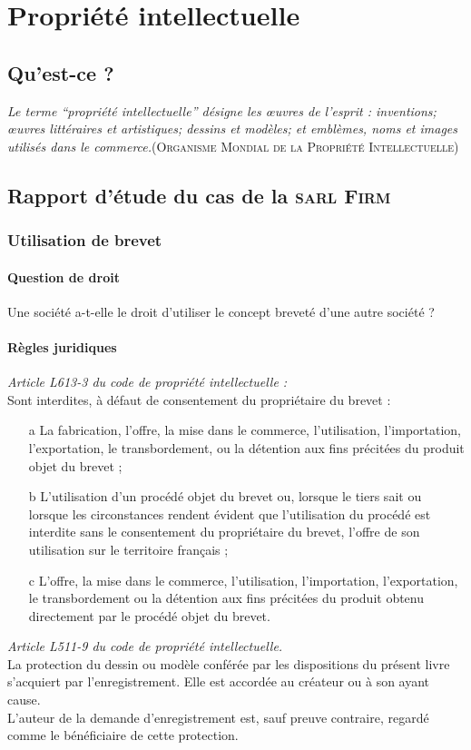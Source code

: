 \chapter{Propriété intellectuelle}
\thispagestyle{fancy} 

\section{Qu'est-ce ?}

\emph{Le terme “propriété intellectuelle” désigne les œuvres de l’esprit : inventions; œuvres littéraires et artistiques; dessins et modèles; et emblèmes, noms et images utilisés dans le commerce.}\textsc{(Organisme Mondial de la Propriété Intellectuelle)}

\section{Rapport d'étude du cas de la \textsc{sarl Firm}}

\subsection{Utilisation de brevet}
\subsubsection{Question de droit}
Une société a-t-elle le droit d'utiliser le concept breveté d'une autre société ?
\subsubsection{Règles juridiques}
\textit{Article L613-3 du code de propriété intellectuelle : }\\
Sont interdites, à défaut de consentement du propriétaire du brevet :
\begin{itemize}
\item[a] La fabrication, l'offre, la mise dans le commerce, l'utilisation, l'importation, l'exportation, le transbordement, ou la détention aux fins précitées du produit objet du brevet ;
\item[b] L'utilisation d'un procédé objet du brevet ou, lorsque le tiers sait ou lorsque les circonstances rendent évident que l'utilisation du procédé est interdite sans le consentement du propriétaire du brevet, l'offre de son utilisation sur le territoire français ;
\item[c] L'offre, la mise dans le commerce, l'utilisation, l'importation, l'exportation, le transbordement ou la détention aux fins précitées du produit obtenu directement par le procédé objet du brevet.
\end{itemize}
\textit{Article L511-9 du code de propriété intellectuelle.}\\
La protection du dessin ou modèle conférée par les dispositions du présent livre s'acquiert par l'enregistrement. Elle est accordée au créateur ou à son ayant cause.\\
L'auteur de la demande d'enregistrement est, sauf preuve contraire, regardé comme le bénéficiaire de cette protection.
